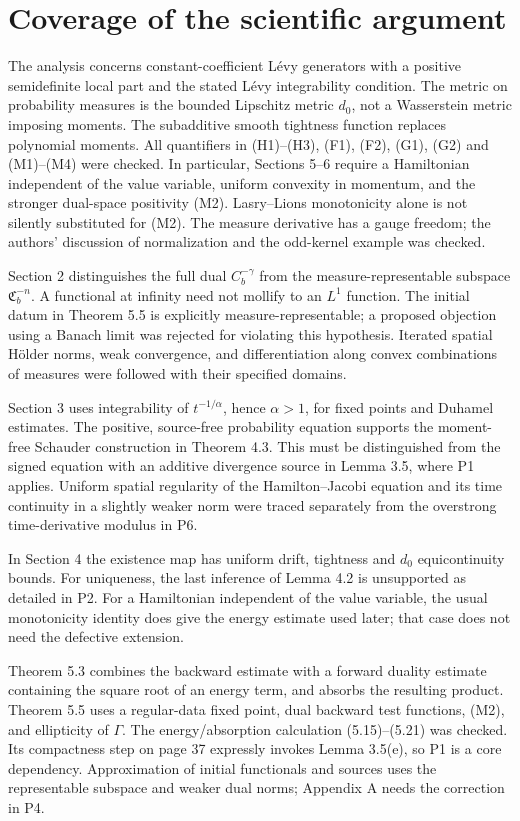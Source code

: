 \documentclass[10pt]{article}
\begin{document}
\section*{Coverage of the scientific argument}
The analysis concerns constant-coefficient Lévy generators with a positive semidefinite local part and the stated Lévy integrability condition. The metric on probability measures is the bounded Lipschitz metric \(d_0\), not a Wasserstein metric imposing moments. The subadditive smooth tightness function replaces polynomial moments. All quantifiers in (H1)–(H3), (F1), (F2), (G1), (G2) and (M1)–(M4) were checked. In particular, Sections 5–6 require a Hamiltonian independent of the value variable, uniform convexity in momentum, and the stronger dual-space positivity (M2). Lasry–Lions monotonicity alone is not silently substituted for (M2). The measure derivative has a gauge freedom; the authors’ discussion of normalization and the odd-kernel example was checked.\par
Section 2 distinguishes the full dual \(C_b^{-\gamma}\) from the measure-representable subspace \(\mathfrak C_b^{-n}\). A functional at infinity need not mollify to an \(L^1\) function. The initial datum in Theorem 5.5 is explicitly measure-representable; a proposed objection using a Banach limit was rejected for violating this hypothesis. Iterated spatial Hölder norms, weak convergence, and differentiation along convex combinations of measures were followed with their specified domains.\par
Section 3 uses integrability of \(t^{-1/\alpha}\), hence \(\alpha>1\), for fixed points and Duhamel estimates. The positive, source-free probability equation supports the moment-free Schauder construction in Theorem 4.3. This must be distinguished from the signed equation with an additive divergence source in Lemma 3.5, where P1 applies. Uniform spatial regularity of the Hamilton–Jacobi equation and its time continuity in a slightly weaker norm were traced separately from the overstrong time-derivative modulus in P6.\par
In Section 4 the existence map has uniform drift, tightness and \(d_0\) equicontinuity bounds. For uniqueness, the last inference of Lemma 4.2 is unsupported as detailed in P2. For a Hamiltonian independent of the value variable, the usual monotonicity identity does give the energy estimate used later; that case does not need the defective extension.\par
Theorem 5.3 combines the backward estimate with a forward duality estimate containing the square root of an energy term, and absorbs the resulting product. Theorem 5.5 uses a regular-data fixed point, dual backward test functions, (M2), and ellipticity of \(\Gamma\). The energy/absorption calculation (5.15)–(5.21) was checked. Its compactness step on page 37 expressly invokes Lemma 3.5(e), so P1 is a core dependency. Approximation of initial functionals and sources uses the representable subspace and weaker dual norms; Appendix A needs the correction in P4.\par
\end{document}
